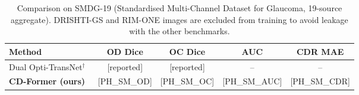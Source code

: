\begin{table}[t]
\centering
\caption{Comparison on SMDG-19 (Standardised Multi-Channel Dataset for Glaucoma,
19-source aggregate). DRISHTI-GS and RIM-ONE images are excluded from training
to avoid leakage with the other benchmarks.}
\label{tab:smdg19}
\setlength{\tabcolsep}{8pt}
\renewcommand{\arraystretch}{1.15}
\begin{tabular}{lcccc}
\toprule
\textbf{Method} & \textbf{OD Dice} & \textbf{OC Dice} & \textbf{AUC} & \textbf{CDR MAE} \\
\midrule
Dual Opti-TransNet$^\dagger$~\cite{dualoptitrans2026} & [reported] & [reported] & -- & -- \\
\midrule
\rowcolor{ourrow}
\textbf{\textcolor{ourbold}{CD-Former (ours)}} & [PH\_SM\_OD] & [PH\_SM\_OC] & [PH\_SM\_AUC] & [PH\_SM\_CDR] \\
\bottomrule
\end{tabular}
\end{table}


